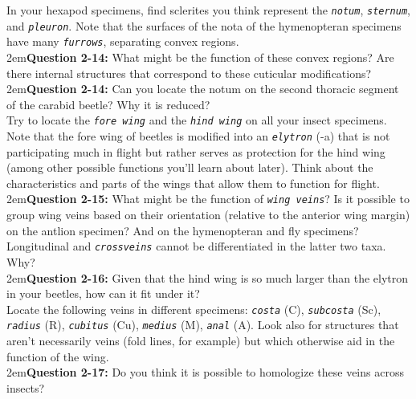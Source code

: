 \documentclass[letterpaper, 11pt]{article}
\newcommand{\latinword}[1]{\texttt{\itshape #1}}%
\begin{document}
\noindent{}In your hexapod specimens, find sclerites you think represent the \latinword{notum}, \latinword{sternum}, and \latinword{pleuron}. Note that the surfaces of the nota of the hymenopteran specimens have many \latinword{furrows}, separating convex regions.\\

\hangindent2em\textbf{Question 2-14:} What might be the function of these convex regions? Are there internal structures that correspond to these cuticular modifications?\\

\hangindent2em\textbf{Question 2-14:} Can you locate the notum on the second thoracic segment of the carabid beetle? Why it is reduced?\\

\noindent{}Try to locate the \latinword{fore wing} and the \latinword{hind wing} on all your insect specimens. Note that the fore wing of beetles is modified into an \latinword{elytron} (-a) that is not participating much in flight but rather serves as protection for the hind wing (among other possible functions you'll learn about later). Think about the characteristics and parts of the wings that allow them to function for flight. \\

\hangindent2em\textbf{Question 2-15:} What might be the function of \latinword{wing veins}? Is it possible to group wing veins based on their orientation (relative to the anterior wing margin) on the antlion specimen? And on the hymenopteran and fly specimens? Longitudinal and \latinword{crossveins} cannot be differentiated in the latter two taxa. Why? \\

\hangindent2em\textbf{Question 2-16:} Given that the hind wing is so much larger than the elytron in your beetles, how can it fit under it?\\

\noindent{}Locate the following veins in different specimens: \latinword{costa} (C), \latinword{subcosta} (Sc), \latinword{radius} (R), \latinword{cubitus} (Cu), \latinword{medius} (M), \latinword{anal} (A). Look also for structures that aren't necessarily veins (fold lines, for example) but which otherwise aid in the function of the wing.\\

\hangindent2em\textbf{Question 2-17:} Do you think it is possible to homologize these veins across insects? \\
\end{document}
